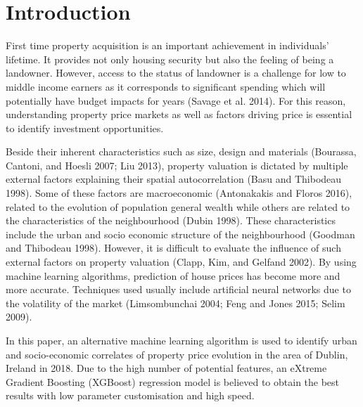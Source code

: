 \documentclass[conference,final,]{IEEEtran}
\begin{document}
%
\IEEEpeerreviewmaketitle








\hypertarget{introduction}{%
\section{Introduction}\label{introduction}}

First time property acquisition is an important achievement in individuals' lifetime. It provides not only housing security but also the feeling of being a landowner. However, access to the status of landowner is a challenge for low to middle income earners as it corresponds to significant spending which will potentially have budget impacts for years (Savage et al. 2014). For this reason, understanding property price markets as well as factors driving price is essential to identify investment opportunities.

Beside their inherent characteristics such as size, design and materials (Bourassa, Cantoni, and Hoesli 2007; Liu 2013), property valuation is dictated by multiple external factors explaining their spatial autocorrelation (Basu and Thibodeau 1998). Some of these factors are macroeconomic (Antonakakis and Floros 2016), related to the evolution of population general wealth while others are related to the characteristics of the neighbourhood (Dubin 1998). These characteristics include the urban and socio economic structure of the neighbourhood (Goodman and Thibodeau 1998). However, it is difficult to evaluate the influence of such external factors on property valuation (Clapp, Kim, and Gelfand 2002). By using machine learning algorithms, prediction of house prices has become more and more accurate. Techniques used usually include artificial neural networks due to the volatility of the market (Limsombunchai 2004; Feng and Jones 2015; Selim 2009).

In this paper, an alternative machine learning algorithm is used to identify urban and socio-economic correlates of property price evolution in the area of Dublin, Ireland in 2018. Due to the high number of potential features, an eXtreme Gradient Boosting (XGBoost) regression model is believed to obtain the best results with low parameter customisation and high speed.
\end{document}
